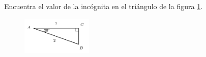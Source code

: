 \question[15]  Encuentra el valor de la incógnita en el triángulo de la figura \ref{fig:lados_functrig_11}.
\begin{figure}[H]
    \begin{center}
        \includegraphics[width=0.3\textwidth]{../images/lados_functrig_11.png}
    \end{center}
    \caption{}
    \label{fig:lados_functrig_11}
\end{figure}